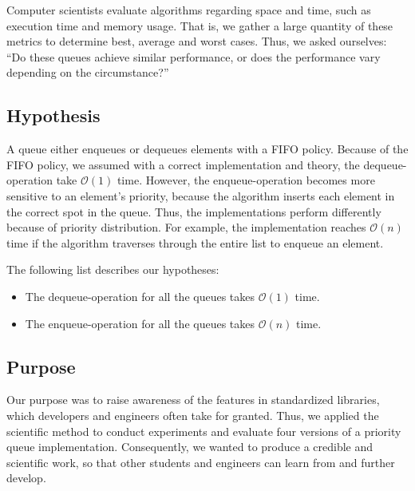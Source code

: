 \documentclass[a4paper,11pt]{kth-mag}
\newcommand*{\skippara}{\par\vspace{\baselineskip} \noindent}
\begin{document}
\skippara
Computer scientists evaluate algorithms regarding space and time, such as execution time and memory usage.
That is, we gather a large quantity of these metrics to determine best, average and worst cases.
Thus, we asked ourselves: ``Do these queues achieve similar performance, or does the performance vary depending on the circumstance?''


\clearpage
\subsection{Hypothesis}
A queue either enqueues or dequeues elements with a FIFO policy.
Because of the FIFO policy, we assumed with a correct implementation and theory, the dequeue- operation take $\mathcal{O}(1)$ time.
However, the enqueue-operation becomes more sensitive to an element's priority, because the algorithm inserts each element in the correct spot in the queue.
Thus, the implementations perform differently because of priority distribution.
For example, the implementation reaches $\mathcal{O}(n)$ time if the algorithm traverses through the entire list to enqueue an element.

\skippara The following list describes our hypotheses:
\begin{itemize}
    \item The dequeue-operation for all the queues takes $\mathcal{O}(1)$ time.
    \item The enqueue-operation for all the queues takes $\mathcal{O}(n)$ time.
\end{itemize}

\subsection{Purpose}\label{sec:purpose}
\skippara Our purpose was to raise awareness of the features in standardized libraries, which developers and engineers often take for granted.
Thus, we applied the scientific method to conduct experiments and evaluate four versions of a priority queue implementation.
Consequently, we wanted to produce a credible and scientific work, so that other students and engineers can learn from and further develop.
\end{document}
